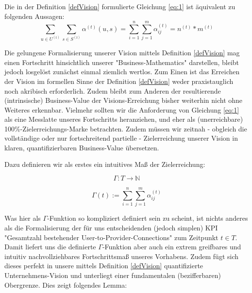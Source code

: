 \vspace{0.3cm}

\begin{Theorem}
Die in der Definition \ref{defVision} formulierte Gleichung \eqref{eq:1} ist äquivalent zu folgenden Aussagen: 
\begin{equation*}
  \sum_{u \in U^{(t)}} \sum_{s \in S^{(t)}} \alpha^{(t)}(u, s) = \sum_{i=1}^n \sum_{j=1}^m \alpha^{(t)}_{ij} = n^{(t)} * m^{(t)}
\end{equation*}
\end{Theorem}

\vspace{1cm}

Die gelungene Formalisierung unserer Vision mittels Definition \ref{defVision} mag einen Fortschritt hinsichtlich unserer "Business-Mathematics" darstellen, bleibt jedoch losgelöst zunächst einmal ziemlich wertlos. Zum Einen ist das Erreichen der Vision im formellen Sinne der Definition \ref{defVision} weder praxistauglich noch akribisch erforderlich. Zudem bleibt zum Anderen der resultierende (intrinsische) Business-Value der Visions-Erreichung bisher weiterhin nicht ohne Weiteres erkennbar.
Vielmehr sollten wir die Anforderung von Gleichung \eqref{eq:1} als eine Messlatte unseres Fortschritts heranziehen, und eher als (unerreichbare) 100\%-Zielerreichungs-Marke betrachten. Zudem müssen wir zeitnah - obgleich die vollständige oder nur fortschreitend partielle - Zielerreichung unserer Vision in klaren, quantifizierbaren Business-Value übersetzen.

Dazu definieren wir als erstes ein intuitives Maß der Zielerreichung:

\vspace{0.3cm}

\begin{Def}\label{defGamma}

\begin{equation*}
  \Gamma : T \rightarrow \mathbb{N} 
\end{equation*}

\begin{equation*}
  \Gamma(t):= \sum_{i=1}^n \sum_{j=1}^m \alpha^{(t)}_{ij} 
\end{equation*}

\end{Def}

\vspace{1cm}

Was hier als $\Gamma$-Funktion so kompliziert definiert sein zu scheint, ist nichts anderes als die Formalisierung der für uns entscheidenden (jedoch simplen) KPI "Gesamtzahl bestehender User-to-Provider-Connections" zum Zeitpunkt $t \in T$. Damit liefert uns die definierte $\Gamma$-Funktion aber auch ein extrem greifbares und intuitiv nachvollziehbares Fortschrittsmaß unseres Vorhabens. Zudem fügt sich dieses perfekt in unsere mittels Definition \ref{defVision} quantifizierte Unternehmens-Vision und unterliegt einer fundamentalen (bezifferbaren) Obergrenze. Dies zeigt folgendes Lemma:

